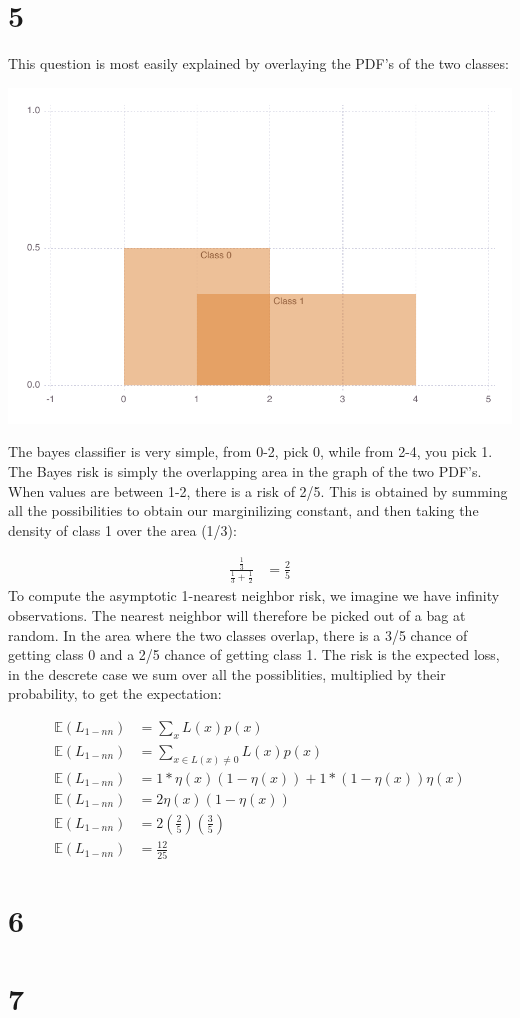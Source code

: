 \documentclass[a4paper,12pt]{article}
\begin{document}
\section*{5}
This question is most easily explained by overlaying the PDF's of the two classes:

\includegraphics[width=\linewidth]{figures/weave-test_1_1.pdf}



The bayes classifier is very simple, from 0-2, pick 0, while from 2-4, you pick 1. The Bayes risk is simply the overlapping area in the graph of the two PDF's. When values are between 1-2, there is a risk of 2/5. This is obtained by summing all the possibilities to obtain our marginilizing constant, and then taking the density of class 1 over the area (1/3):

\begin{align*}
\frac{\frac{1}{3}}{\frac{1}{3} + \frac{1}{2}} &= \frac{2}{5}
\end{align*}
%
To compute the asymptotic 1-nearest neighbor risk, we imagine we have infinity observations. The nearest neighbor will therefore be picked out of a bag at random. In the area where the two classes overlap, there is a 3/5 chance of getting class 0 and a 2/5 chance of getting class 1. The risk is the expected loss, in the descrete case we sum over all the possiblities, multiplied by their probability, to get the expectation:

\begin{align*}
\mathbb{E}(L_{1-nn}) &= \sum_x L(x)p(x) \\
\mathbb{E}(L_{1-nn}) &= \sum_{x \in L(x) \neq 0 } L(x)p(x) \\
\mathbb{E}(L_{1-nn}) &= 1*\eta(x)(1-\eta(x)) + 1*(1-\eta(x))\eta(x) \\
\mathbb{E}(L_{1-nn}) &= 2\eta(x)(1-\eta(x)) \\
\mathbb{E}(L_{1-nn}) &= 2(\frac{2}{5})(\frac{3}{5}) \\
\mathbb{E}(L_{1-nn}) &= \frac{12}{25}
\end{align*}

\section*{6}


\section*{7}
\end{document}
